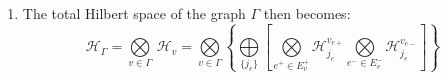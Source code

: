 \documentclass[preprint]{SciPost}
\newcommand{\mc}[1]{\mathcal{#1}}
\theoremstyle{plain} %
\begin{document}
\begin{enumerate}[label=\arabic*.]
\begin{equation}
		\end{equation}
		where $ E^+_v, E^-_v $ are the sets of all outgoing and ingoing edges, respectively, connected to $ v $ and the outermost tensor sum is over the set of all possible labeling of edges in $ E_v = E^+_v \cup E^-_v $ with representations of $ SU(2) $.
		\item The total Hilbert space of the graph $ \Gamma $ then becomes:
		\begin{equation}\label{eqn:graph-hilbert-space-v3}
		\mc{H}_\Gamma = \underset{v \in \Gamma}{\bigotimes}~ \mathcal{H}_v = \underset{v \in \Gamma}{\bigotimes} \left\{ \underset{\{j_e\}}{\bigoplus} \left[ \underset{{e^+\in E^+_v}}{\bigotimes} \mc{H}^{v_{e+}}_{j_e} \underset{{e^-\in E^-_v}}{\bigotimes} \mc{H}^{v_{e-}}_{j_e} \right] \right\}
		\end{equation}
	\end{enumerate}
\end{document}
